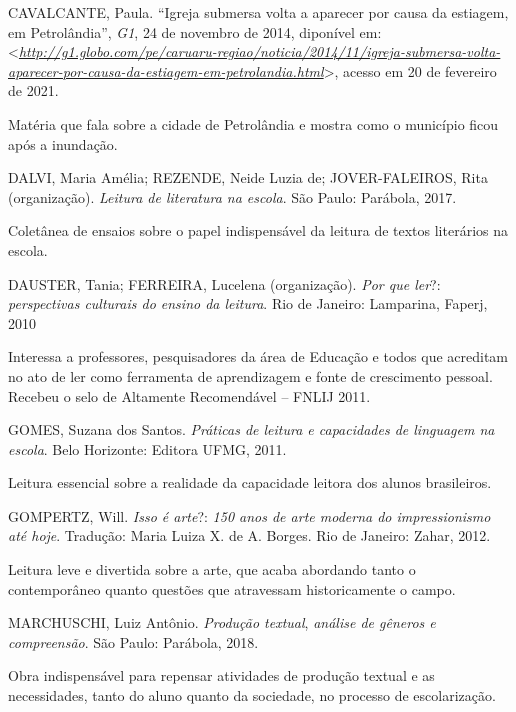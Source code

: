 \documentclass{extrarticle}
\begin{document}
    CAVALCANTE, Paula. ``Igreja submersa volta a aparecer por causa da
    estiagem, em Petrolândia'', \emph{G1}, 24 de novembro de 2014,
    diponível em:
    \textless{}\href{http://g1.globo.com/pe/caruaru-regiao/noticia/2014/11/igreja-submersa-volta-aparecer-por-causa-da-estiagem-em-petrolandia.html}{\emph{http://g1.globo.com/pe/caruaru-regiao/noticia/2014/11/igreja-submersa-volta-aparecer-por-causa-da-estiagem-em-petrolandia.html}}\textgreater{},
    acesso em 20 de fevereiro de 2021.

    Matéria que fala sobre a cidade de Petrolândia e mostra como o
    município ficou após a inundação.

    DALVI, Maria Amélia; REZENDE, Neide Luzia de; JOVER-FALEIROS, Rita
    (organização). \emph{Leitura de literatura na escola}. São Paulo:
    Parábola, 2017.

    Coletânea de ensaios sobre o papel indispensável da leitura de
    textos literários na escola.

    DAUSTER, Tania; FERREIRA, Lucelena (organização). \emph{Por que
    ler}?: \emph{perspectivas culturais do ensino da leitura}. Rio de
    Janeiro: Lamparina, Faperj, 2010

    Interessa a professores, pesquisadores da área de Educação e todos
    que acreditam no ato de ler como ferramenta de aprendizagem e fonte
    de crescimento pessoal. Recebeu o selo de Altamente Recomendável --
    FNLIJ 2011.

    GOMES, Suzana dos Santos. \emph{Práticas de leitura e capacidades de
    linguagem na escola}. Belo Horizonte: Editora UFMG, 2011.

    Leitura essencial sobre a realidade da capacidade leitora dos alunos
    brasileiros.

    GOMPERTZ, Will. \emph{Isso é arte}?: \emph{150 anos de arte moderna
    do impressionismo até hoje}. Tradução: Maria Luiza X. de A. Borges.
    Rio de Janeiro: Zahar, 2012.

    Leitura leve e divertida sobre a arte, que acaba abordando tanto o
    contemporâneo quanto questões que atravessam historicamente o campo.

    MARCHUSCHI, Luiz Antônio\textsc{.} \emph{Produção textual},
    \emph{análise de gêneros e compreensão}. São Paulo: Parábola, 2018.

    Obra indispensável para repensar atividades de produção textual e as
    necessidades, tanto do aluno quanto da sociedade, no processo de
    escolarização.
\end{document}
